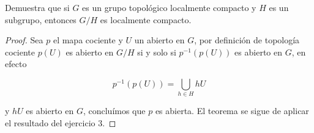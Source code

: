 
\item Demuestra que si $G$ es un grupo topológico localmente compacto y $H$ es un subgrupo, entonces $G / H$ es localmente compacto.

\begin{proof}
    Sea $p$ el mapa cociente y $U$ un abierto en $G$, por definición de topología cociente $p(U)$ es abierto en $G/H$ si y solo si $p^{-1}(p(U))$ es abierto en $G$, en efecto 

    $$p^{-1}(p(U))=\bigcup_{h\in H}hU$$

    y $hU$ es abierto en $G$, concluímos que $p$ es abierta. El teorema se sigue de aplicar el resultado del ejercicio 3.
\end{proof}